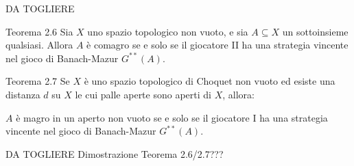 \documentclass[babel]{beamer}
\renewcommand{\href}[2]{#2}
\begin{document}
\begin{frame}[label={sec:org53ca00e}]{DA TOGLIERE}
\begin{alertblock}{Teorema 2.6}
Sia \(X\) uno \href{../../../../../../../org/roam/20250103145124-topologia.org}{spazio topologico} \href{../../../../../../../org/roam/20250131161811-insieme_vuoto_mk.org}{non vuoto}, e sia \(A \subseteq X\) un \href{../../../../../../../org/roam/20250131155822-operazioni_insiemistiche_tra_classi_mk.org}{sottoinsieme} qualsiasi. Allora \(A\) è \href{../../../../../../../org/roam/20250419122752-insieme_magro.org}{comagro} se e solo se il giocatore II ha una \href{../../../../../../../org/roam/20250513171520-giochi_di_gale_stewart.org}{strategia vincente} nel \href{../../../../../../../org/roam/20250513111844-gioco_di_banach_mazur.org}{gioco di Banach-Mazur} \(G^{**}(A)\).
\end{alertblock}
\begin{alertblock}{Teorema 2.7}
Se \(X\) è uno \href{../../../../../../../org/roam/20250103145124-topologia.org}{spazio topologico} \href{../../../../../../../org/roam/20250514174255-gioco_di_choquet.org}{di Choquet} non \href{../../../../../../../org/roam/20250131161811-insieme_vuoto_mk.org}{vuoto} ed esiste una \href{../../../../../../../org/roam/20250301193511-spazio_metrico.org}{distanza} \(d\) su \(X\) le cui \href{../../../../../../../org/roam/20250301193511-spazio_metrico.org}{palle aperte} sono aperti di \(X\), allora:

\(A\) è \href{../../../../../../../org/roam/20250419122752-insieme_magro.org}{magro} in un \href{../../../../../../../org/roam/20250103145124-topologia.org}{aperto} non vuoto se e solo se il giocatore I ha una \href{../../../../../../../org/roam/20250513171520-giochi_di_gale_stewart.org}{strategia vincente} nel \href{../../../../../../../org/roam/20250513111844-gioco_di_banach_mazur.org}{gioco di Banach-Mazur} \(G^{**}(A)\).
\end{alertblock}
\end{frame}
\begin{frame}[label={sec:org74c9e70}]{DA TOGLIERE}
Dimostrazione Teorema 2.6/2.7???
\end{frame}
\end{document}
